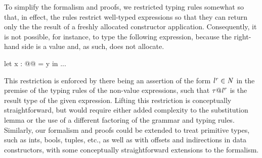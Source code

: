 \documentclass[showabstract,showacknowledgments,showpreface,showdedication]{iuphd}
\theoremstyle{nonumberplain}
\begin{document}
To simplify the formalism and proofs, we restricted typing rules
somewhat so that, in effect, the rules restrict well-typed expressions
so that they can return only the the result of a freshly allocated
constructor application.
%
Consequently, it is not possible, for instance, to type the following
expression, because the right-hand side is a value and, as such, does
not allocate.
%
\begin{code}
let x : @@ = y in ...
\end{code}
%
This restriction is enforced by there being an assertion of the form
${\mathit{l}}^{\mathit{r}} \in \mathit{N}$ in the premise of the typing rules of
the non-value expressions, such that $\mathit{\tau} @ {\mathit{l}}^{\mathit{r}}$
is the result type of the given expression.
%
Lifting this restriction is conceptually straightforward, but would
require either added complexity to the substitution lemma or the use
of a different factoring of the grammar and typing rules.
%
Similarly, our formalism and proofs could be extended to treat
primitive types, such as ints, bools, tuples, etc., as well as with
offsets and indirections in data constructors, with some conceptually
straightforward extensions to the formalism.


\end{document}
